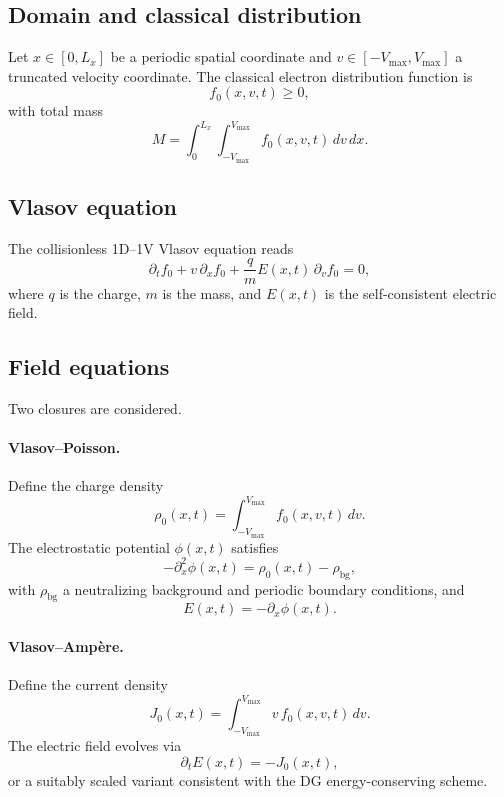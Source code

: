 \documentclass[11pt]{article}
\begin{document}
\subsection{Domain and classical distribution}

Let $x \in [0,L_x]$ be a periodic spatial coordinate and
$v \in [-V_{\max},V_{\max}]$ a truncated velocity coordinate.
The classical electron distribution function is
\[
  f_0(x,v,t) \ge 0,
\]
with total mass
\[
  M = \int_0^{L_x}\int_{-V_{\max}}^{V_{\max}} f_0(x,v,t)\,dv\,dx.
\]

\subsection{Vlasov equation}

The collisionless 1D--1V Vlasov equation reads
\begin{equation}
  \partial_t f_0 + v\,\partial_x f_0 + \frac{q}{m} E(x,t)\,\partial_v f_0 = 0,
  \label{eq:classical_vlasov}
\end{equation}
where $q$ is the charge, $m$ is the mass, and $E(x,t)$ is the self-consistent
electric field.

\subsection{Field equations}

Two closures are considered.

\paragraph{Vlasov--Poisson.}
Define the charge density
\[
  \rho_0(x,t) = \int_{-V_{\max}}^{V_{\max}} f_0(x,v,t)\,dv.
\]
The electrostatic potential $\phi(x,t)$ satisfies
\begin{equation}
  -\partial_x^2 \phi(x,t) = \rho_0(x,t) - \rho_{\mathrm{bg}},
  \label{eq:poisson}
\end{equation}
with $\rho_{\mathrm{bg}}$ a neutralizing background and periodic boundary
conditions, and
\[
  E(x,t) = -\partial_x \phi(x,t).
\]

\paragraph{Vlasov--Amp\`ere.}
Define the current density
\[
  J_0(x,t) = \int_{-V_{\max}}^{V_{\max}} v\,f_0(x,v,t)\,dv.
\]
The electric field evolves via
\begin{equation}
  \partial_t E(x,t) = -J_0(x,t),
  \label{eq:ampere}
\end{equation}
or a suitably scaled variant consistent with the DG energy-conserving scheme.
\end{document}

